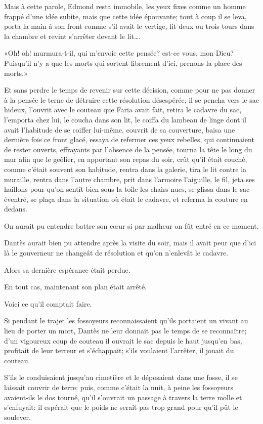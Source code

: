 Mais à cette parole, Edmond resta immobile, les yeux fixes comme un homme frappé d'une idée subite, mais que cette idée épouvante; tout à coup il se leva, porta la main à son front comme s'il avait le vertige, fit deux ou trois tours dans la chambre et revint s'arrêter devant le lit\dots.

«Oh! oh! murmura-t-il, qui m'envoie cette pensée? est-ce vous, mon Dieu? Puisqu'il n'y a que les morts qui sortent librement d'ici, prenons la place des morts.»

Et sans perdre le temps de revenir sur cette décision, comme pour ne pas donner à la pensée le terne de détruire cette résolution désespérée, il se pencha vers le sac hideux, l'ouvrit avec le couteau que Faria avait fait, retira le cadavre du sac, l'emporta chez lui, le coucha dans son lit, le coiffa du lambeau de linge dont il avait l'habitude de se coiffer lui-même, couvrit de sa couverture, baisa une dernière fois ce front glacé, essaya de refermer ces yeux rebelles, qui continuaient de rester ouverts, effrayants par l'absence de la pensée, tourna la tête le long du mur afin que le geôlier, en apportant son repas du soir, crût qu'il était couché, comme c'était souvent son habitude, rentra dans la galerie, tira le lit contre la muraille, rentra dans l'autre chambre, prit dans l'armoire l'aiguille, le fil, jeta ses haillons pour qu'on sentît bien sous la toile les chairs nues, se glissa dans le sac éventré, se plaça dans la situation où était le cadavre, et referma la couture en dedans.

On aurait pu entendre battre son cœur si par malheur on fût entré en ce moment.

Dantès aurait bien pu attendre après la visite du soir, mais il avait peur que d'ici là le gouverneur ne changeât de résolution et qu'on n'enlevât le cadavre.

Alors sa dernière espérance était perdue.

En tout cas, maintenant son plan était arrêté.

Voici ce qu'il comptait faire.

Si pendant le trajet les fossoyeurs reconnaissaient qu'ils portaient un vivant au lieu de porter un mort, Dantès ne leur donnait pas le temps de se reconnaître; d'un vigoureux coup de couteau il ouvrait le sac depuis le haut jusqu'en bas, profitait de leur terreur et s'échappait; s'ils voulaient l'arrêter, il jouait du couteau.

S'ils le conduisaient jusqu'au cimetière et le déposaient dans une fosse, il se laissait couvrir de terre; puis, comme c'était la nuit, à peine les fossoyeurs avaient-ils le dos tourné, qu'il s'ouvrait un passage à travers la terre molle et s'enfuyait: il espérait que le poids ne serait pas trop grand pour qu'il pût le soulever.

